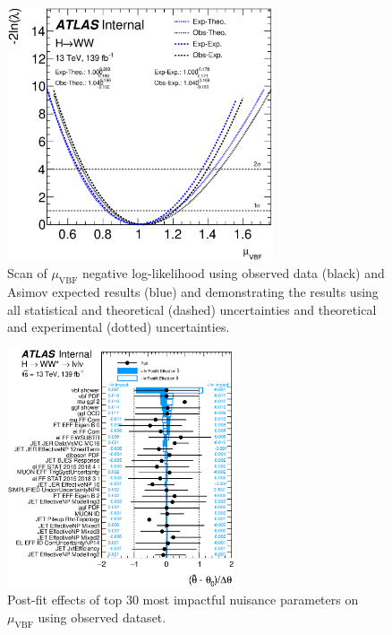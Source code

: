 \begin{figure}[!h]
\centering
\includegraphics[width=0.7\textwidth]{Pictures/fitresults/mu_vbf.eps}
\caption{Scan of $\mu_{\text{VBF}}$ negative log-likelihood using observed data (black) and Asimov expected results (blue) and demonstrating the results using all statistical and theoretical (dashed) uncertainties and theoretical and experimental (dotted) uncertainties.}
\label{fig:scan2}
\end{figure}

\begin{figure}[!h]
\centering
      \includegraphics[width=0.6\textwidth]{Pictures/fitresults/impact_data_mu_vbf.eps}
{\caption{Post-fit effects of top 30 most impactful nuisance parameters on $\mu_{\text{VBF}}$ using observed dataset.}
\label{fig:impacts}}
\end{figure}

